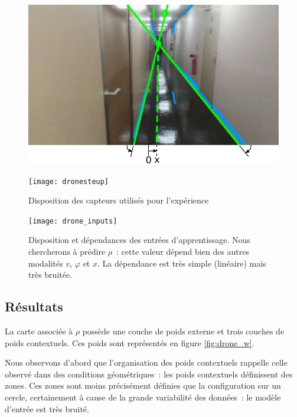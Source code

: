 \documentclass[../main]{subfiles}
\begin{document}
\begin{figure}
	\begin{minipage}{0.5\textwidth}
	\includegraphics[width=\textwidth]{visudrone.pdf}
	\end{minipage}
	\begin{minipage}{0.5\textwidth}
	\texttt{[image: dronesteup]}
	\end{minipage}
	\caption{Disposition des capteurs utilisés pour l'expérience}
	\label{fig:drone}
	\end{figure}

\begin{figure}
	\centering\texttt{[image: drone\_inputs]}
	\caption{Disposition et dépendances des entrées d'apprentissage. Nous chercherons à prédire $\rho$~: cette valeur dépend bien des autres modalités $v$, $\varphi$ et $x$. La dépendance est très simple (linéaire) mais très bruitée. \label{fig:drone_inp}}
\end{figure}


\subsection{Résultats}

La carte associée à $\rho$ possède une couche de poids externe et trois couches de poids contextuels. 
Ces poids sont représentés en figure \ref{fig:drone_w}. 

Nous observons d'abord que l'organisation des poids contextuels rappelle celle observé dans des conditions géométriques~: les poids contextuels définissent des zones. 
Ces zones sont moins précisément définies que la configuration sur un cercle, certainement à cause de la grande variabilité des données~: le modèle d'entrée est très bruité.
\end{document}
